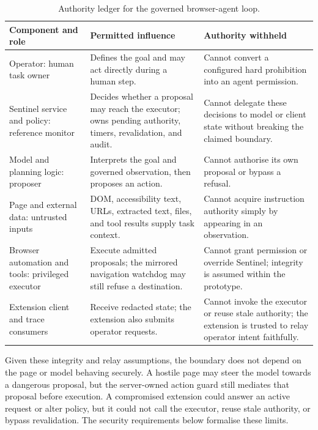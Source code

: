\begin{table}[htbp]
\centering
\caption{Authority ledger for the governed browser-agent loop.}
\label{tab:trust-boundaries}
\footnotesize
\renewcommand{\arraystretch}{1.35}
\setlength{\tabcolsep}{4.5pt}
\begin{tabularx}{\textwidth}{@{}L{0.21\textwidth}L{0.31\textwidth}Y@{}}
\toprule
Component and role & Permitted influence & Authority withheld \\
\midrule
Operator: human task owner & Defines the goal and may act directly during a
human step. & Cannot convert a configured hard prohibition into an agent
permission. \\
\addlinespace[3pt]

Sentinel service and policy: reference monitor & Decides whether a proposal may
reach the executor; owns pending authority, timers, revalidation, and audit. &
Cannot delegate these decisions to model or client state without breaking the
claimed boundary. \\
\addlinespace[3pt]

Model and planning logic: proposer & Interprets the goal and governed
observation, then proposes an action. & Cannot authorise its own proposal or
bypass a refusal. \\
\addlinespace[3pt]

Page and external data: untrusted inputs & DOM, accessibility text, URLs,
extracted text, files, and tool results supply task context. & Cannot acquire
instruction authority simply by appearing in an observation. \\
\addlinespace[3pt]

Browser automation and tools: privileged executor & Execute admitted proposals;
the mirrored navigation watchdog may still refuse a destination. & Cannot grant
permission or override Sentinel; integrity is assumed within the prototype. \\
\addlinespace[3pt]

Extension client and trace consumers & Receive redacted state; the extension
also submits operator requests. & Cannot invoke the executor or reuse stale
authority; the extension is trusted to relay operator intent faithfully. \\
\bottomrule
\end{tabularx}
\end{table}

Given these integrity and relay assumptions, the boundary does not depend on
the page or model behaving securely. A hostile page may steer the model towards
a dangerous proposal, but the server-owned action guard still mediates that
proposal before execution. A compromised extension could answer an active
request or alter policy, but it could not call the executor, reuse stale
authority, or bypass revalidation. The security requirements below formalise
these limits.

